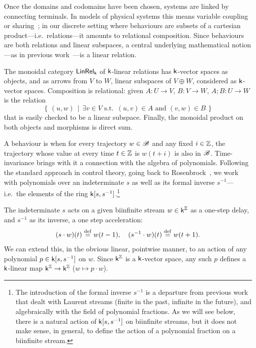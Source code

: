 Once the domains and codomains have been chosen, systems are linked by
connecting terminals. In models of physical systems this means variable coupling
or sharing~\cite{Wi}; in our discrete setting where behaviours are subsets of a
cartesian product---i.e.\ relations---it amounts to relational composition.
Since behaviours are both relations and linear subspaces, a central underlying
mathematical notion---as in previous work~\cite{BSZ1,BE}---is a linear relation. 
\begin{definition}
The monoidal category $\operatorname{\mathsf{LinRel}}_{\mathsf{k}}$ of $\mathsf{k}$-linear relations has $\mathsf{k}$-vector
spaces as objects, and as arrows from $V$ to $W$, linear subspaces of $V\oplus
W$, considered as $\mathsf{k}$-vector spaces.  Composition is relational: given $A\colon
U\to V$, $B\colon V\to W$, $A\mathrel{;}B\colon U\to W$ is the  relation
\[
  \left\{\,(u,w)\,\middle|\,\exists v\in V \textrm{ s.t. } \,(u,v)\in A \textrm{ and } (v,w)\in B\,\right\} 
\] 
that is easily checked to be a linear subspace. Finally, the monoidal product on both
objects and morphisms is direct sum.
\end{definition}


\smallskip
A behaviour is  when for every trajectory $w \in {\mathscr B}$ and
any fixed $i\in{\mathbb Z}$, the trajectory whose value at every time $t\in{\mathbb Z}$ is
$w(t+i)$ is also in ${\mathscr B}$.  
%
Time-invariance brings with it a connection with the algebra of polynomials.
Following the standard approach in control theory, going back to
Rosenbrock~\cite{Ro}, we work with polynomials over an indeterminate $s$ as well
as its formal inverse $s^{-1}$---i.e.\ the elements of the ring
${\mathsf{k}[s,s^{-1}]}$.\footnote{The introduction of the formal inverse $s^{-1}$ is a departure
from previous work~\cite{BSZ1,BSZ3} that dealt with Laurent streams (finite in
the past, infinite in the future), and algebraically with the field of
polynomial fractions. As we will see below, there is a natural action of ${\mathsf{k}[s,s^{-1}]}$
on biinfinite streams, but it does not make sense, in general, to define the
action of a polynomial fraction on a biinfinite stream. }

The indeterminate $s$ acts on a given biinfinite stream $w \in \mathsf{k}^{\mathbb Z}$ as a
one-step delay, and $s^{-1}$ as its inverse, a one step acceleration: 
\[ 
  (s\cdot w) (t) \stackrel{\mathrm{def}}{=} w(t-1),\quad (s^{-1}\cdot w)(t) \stackrel{\mathrm{def}}{=} w(t+1).
\]
We can extend this, in the obvious linear, pointwise manner, to an action of any
polynomial $p\in {\mathsf{k}[s,s^{-1}]}$ on $w$.  Since $\mathsf{k}^{\mathbb Z}$ is a $\mathsf{k}$-vector space, any such
$p$ defines a $\mathsf{k}$-linear map $\mathsf{k}^{\mathbb Z}\to \mathsf{k}^{\mathbb Z}$ ($w \mapsto p\cdot w$).

